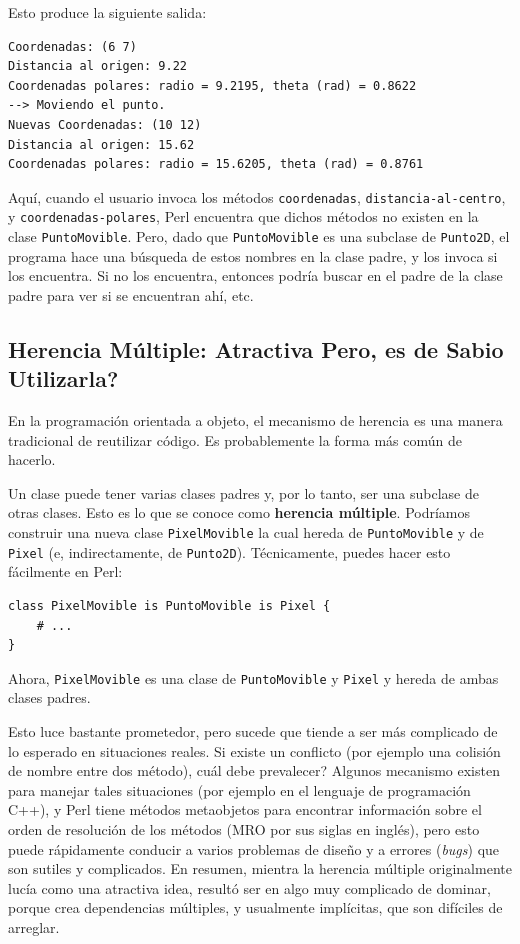 Esto produce la siguiente salida:

\begin{verbatim}
Coordenadas: (6 7)
Distancia al origen: 9.22
Coordenadas polares: radio = 9.2195, theta (rad) = 0.8622
--> Moviendo el punto.
Nuevas Coordenadas: (10 12)
Distancia al origen: 15.62
Coordenadas polares: radio = 15.6205, theta (rad) = 0.8761
\end{verbatim}

Aquí, cuando el usuario invoca los métodos {\tt coordenadas},
{\tt distancia-al-centro}, y {\tt coordenadas-polares}, Perl
encuentra que dichos métodos no existen en la clase {\tt PuntoMovible}.
Pero, dado que \verb|PuntoMovible| es una subclase de {\tt Punto2D},
el programa hace una búsqueda de estos nombres en la clase padre, 
y los invoca si los encuentra. Si no los encuentra, entonces podría
buscar en el padre de la clase padre para ver si se encuentran ahí, etc.


\subsection{Herencia Múltiple: Atractiva Pero, es de Sabio Utilizarla?}

En la programación orientada a objeto, el mecanismo de herencia
es una manera tradicional de reutilizar código. Es probablemente 
la forma más común de hacerlo.

Un clase puede tener varias clases padres y, por lo tanto,
ser una subclase de otras clases. Esto es lo que se conoce como
{\bf herencia múltiple}. Podríamos construir una nueva 
clase {\tt PixelMovible} la cual hereda de {\tt PuntoMovible} 
y de {\tt Pixel} (e, indirectamente, de {\tt Punto2D}). Técnicamente,
puedes hacer esto fácilmente en Perl:

\begin{verbatim}
class PixelMovible is PuntoMovible is Pixel {
    # ...
}
\end{verbatim}

Ahora, {\tt PixelMovible} es una clase de {\tt PuntoMovible}
y {\tt Pixel} y hereda de ambas clases padres.

Esto luce bastante prometedor, pero sucede que tiende a ser
más complicado de lo esperado en situaciones reales. Si existe
un conflicto (por ejemplo una colisión de nombre entre dos método),
cuál debe prevalecer? Algunos mecanismo existen para manejar tales
situaciones (por ejemplo en el lenguaje de programación C++), y
Perl tiene métodos metaobjetos para encontrar información
sobre el orden de resolución de los métodos (MRO por sus siglas en inglés),
pero esto puede rápidamente conducir a varios problemas de diseño y a
errores (\emph{bugs}) que son sutiles y complicados. En resumen, 
mientra la herencia múltiple originalmente lucía como una atractiva idea, 
resultó ser en algo muy complicado de dominar,
porque crea dependencias múltiples, y usualmente implícitas, que son 
difíciles de arreglar.

